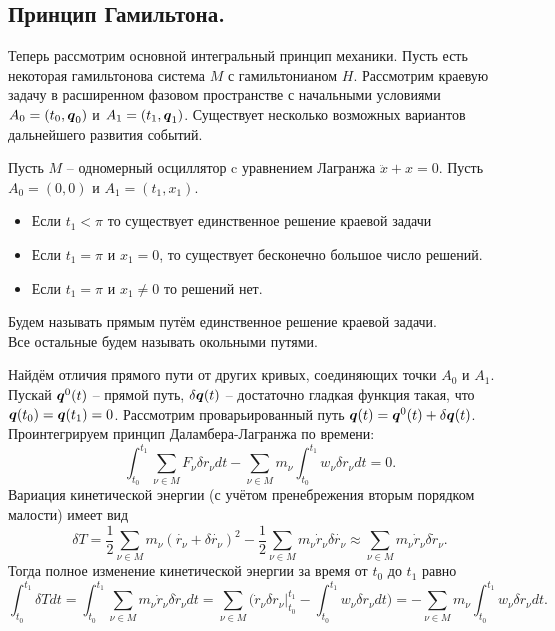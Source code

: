 \subsection{Принцип Гамильтона.}
Теперь рассмотрим основной интегральный принцип механики.
Пусть есть некоторая гамильтонова система $M$ с гамильтонианом $H$.
Рассмотрим краевую задачу в расширенном фазовом пространстве с начальными условиями $A_0 = (t_0, \boldsymbol{q}_0)$ и $A_1 = (t_1, \boldsymbol{q}_1)$.
Существует несколько возможных вариантов дальнейшего развития событий.
\begin{example}
    Пусть $M$ -- одномерный осциллятор c уравнением Лагранжа $\ddot{x} + x = 0$.
    Пусть $A_0 = (0, 0)$ и $A_1 = (t_1, x_1)$.
    \begin{itemize}
        \item Если $t_1 < \pi$ то существует единственное решение краевой задачи
        \item Если $t_1 = \pi$ и $x_1 = 0$, то существует бесконечно большое число решений.
        \item Если $t_1 = \pi$ и $x_1 \neq 0$ то решений нет.
    \end{itemize}
\end{example}
\begin{definition}
    Будем называть прямым путём единственное решение краевой задачи. \\
    Все остальные будем называть окольными путями.
\end{definition}
Найдём отличия прямого пути от других кривых, соединяющих точки $A_0$ и $A_1$. \\
Пускай $\boldsymbol{q}^0(t)$ -- прямой путь, $\delta \boldsymbol{q}(t)$ -- достаточно гладкая функция такая, что $\boldsymbol{q}(t_0) = \boldsymbol{q}(t_1) = 0$.
Рассмотрим проварьированный путь $\boldsymbol{q}(t) = \boldsymbol{q}^0(t) + \delta\boldsymbol{q}(t)$.
Проинтегрируем принцип Даламбера-Лагранжа по времени:
\[
    \int_{t_0}^{t_1} \sum\limits_{\nu \in M} F_{\nu} \delta r_{\nu} dt - \sum\limits_{\nu \in M} m_{\nu} \int_{t_0}^{t_1} w_{\nu} \delta r_{\nu} dt = 0.
\]
Вариация кинетической энергии (с учётом пренебрежения вторым порядком малости) имеет вид
\[
    \delta T = \dfrac{1}{2}\sum\limits_{\nu \in M} m_{\nu}(\dot{r_{\nu}} + \delta \dot{r_\nu})^{2} - \dfrac{1}{2}\sum\limits_{\nu \in M} m_{\nu} \dot{r}_{\nu} \delta \dot{r_\nu} \approx \sum\limits_{\nu \in M} m_{\nu} \dot{r}_{\nu}\delta \dot{r}_{\nu}.
\]
Тогда полное изменение кинетической энергии за время от $t_0$ до $t_1$ равно
\[
    \int_{t_0}^{t_1} \delta T dt = \int_{t_0}^{t_1} \sum\limits_{\nu \in M} m_{\nu} \dot{r}_{\nu} \delta \dot{r}_{\nu} dt = \sum\limits_{\nu \in M} \biggr( \dot{r}_\nu \delta r_{\nu}\big|_{t_0}^{t_1} - \int_{t_0}^{t_1} w_\nu \delta r_{\nu}dt\biggr) = -\sum\limits_{\nu \in M} m_{\nu} \int_{t_0}^{t_1} w_{\nu} \delta r_{\nu} dt.
\]
